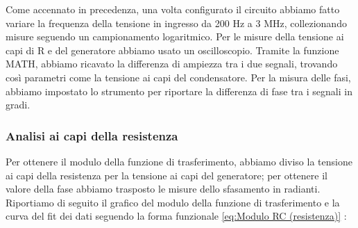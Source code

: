\documentclass[letterpaper,12pt]{article}
\begin{document}
Come accennato in precedenza, una volta configurato il circuito abbiamo fatto variare la frequenza della tensione in ingresso da 200 Hz a 3 MHz, collezionando misure seguendo un campionamento logaritmico. Per le  misure della tensione ai capi di R e del generatore abbiamo usato un oscilloscopio. Tramite la funzione MATH, abbiamo ricavato la differenza di ampiezza tra i due segnali, trovando così parametri come la tensione ai capi del condensatore. Per la misura delle fasi, abbiamo impostato lo strumento per riportare la differenza di fase tra i segnali in gradi.


\subsubsection{Analisi ai capi della resistenza}
 Per ottenere il modulo della funzione di trasferimento, abbiamo diviso la tensione ai capi della resistenza per la tensione ai capi del generatore; per ottenere il valore della fase abbiamo trasposto le misure dello sfasamento in radianti. \\
Riportiamo di seguito il grafico del modulo della funzione di trasferimento e la curva del fit dei dati seguendo la forma funzionale \ref{eq:Modulo RC (resistenza)} : \\
\end{document}
